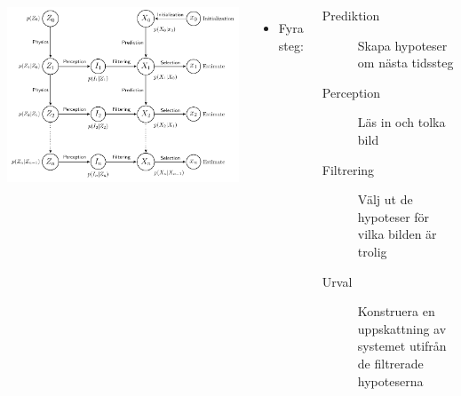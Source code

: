 \documentclass[]{beamer}
\renewcommand{\ae}{\"{a}}
\renewcommand{\oe}{\"{o}}
\begin{document}
\begin{frame}
  
  \begin{columns}[tt]
    \column{2.5in}
    \includegraphics[width=1\textwidth]{hmm-graph-pf.pdf}

    \column{2.5in}
    \begin{itemize}
    \item Fyra steg:
    \end{itemize}
    \begin{description}
    \item[Prediktion] Skapa hypoteser om n\ae sta tidssteg
    \item[Perception] L\ae s in och tolka bild
    \item[Filtrering] V\ae lj ut de hypoteser f\oe r vilka bilden \ae r trolig
    \item[Urval] Konstruera en uppskattning av systemet utifr\aa n de filtrerade hypoteserna
    \end{description}
    
  \end{columns}
\end{frame}
\end{document}
